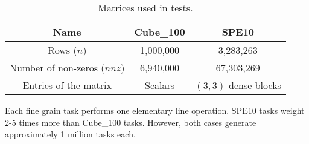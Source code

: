 \begin{table}[!h]
  \renewcommand{\arraystretch}{1.3}
  \caption{Matrices used in tests.}
  \label{matrices}
  \centering
  \begin{tabular}{|c||c|c|}
    \hline
    Name & Cube\_100 & SPE10\\
    \hline
    \hline
    Rows ($n$) & 1,000,000 & 3,283,263\\
    \hline
    Number of non-zeros ($nnz$) & 6,940,000 & 67,303,269\\
    \hline
    Entries of the matrix & Scalars & $(3,3)$ dense blocks\\
    \hline
  \end{tabular}
\end{table}

Each fine grain task performs one elementary line operation. SPE10
tasks weight 2-5 times more than Cube\_100 tasks. However, both
cases generate approximately 1 million tasks each.

